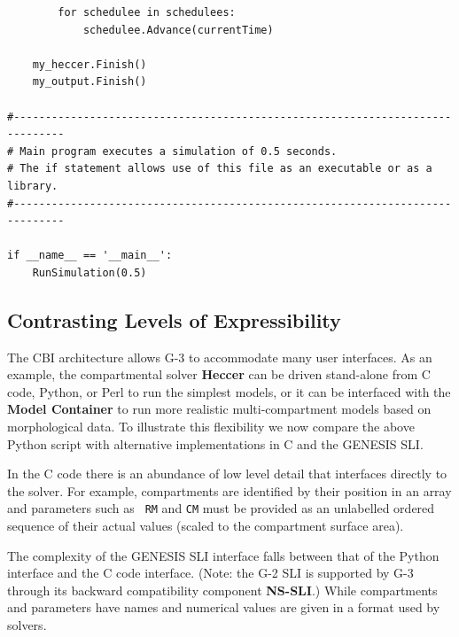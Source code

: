 \documentclass[10pt]{article}
\begin{document}
\begin{verbatim}
        for schedulee in schedulees:
            schedulee.Advance(currentTime)

    my_heccer.Finish()
    my_output.Finish()
  
#------------------------------------------------------------------------------
# Main program executes a simulation of 0.5 seconds.
# The if statement allows use of this file as an executable or as a library.
#------------------------------------------------------------------------------

if __name__ == '__main__':
    RunSimulation(0.5)
\end{verbatim}



\subsection*{Contrasting Levels of Expressibility}

The CBI architecture allows G-3 to accommodate many user
interfaces.  As an example, the compartmental solver {\bf Heccer} can be driven
stand-alone from C code, Python, or Perl to run the simplest
models, or it can be interfaced with the {\bf Model Container} to
run more realistic multi-compartment models based on morphological
data. To illustrate this flexibility we now compare the above Python
script with alternative implementations in C and the GENESIS SLI.

In the C code there is an abundance of low level detail that
interfaces directly to the solver.  For example, compartments are
identified by their position in an array and parameters such as {\tt
  RM} and {\tt CM} must be provided as an unlabelled ordered sequence
of their actual values (scaled to the compartment surface area).

The complexity of the GENESIS SLI interface falls between that of the
Python interface and the C code interface. (Note: the G-2 SLI is supported by G-3 through its backward compatibility component {\bf NS-SLI}.)  While
compartments and parameters have names and numerical values are given in
a format used by solvers.
\end{document}
